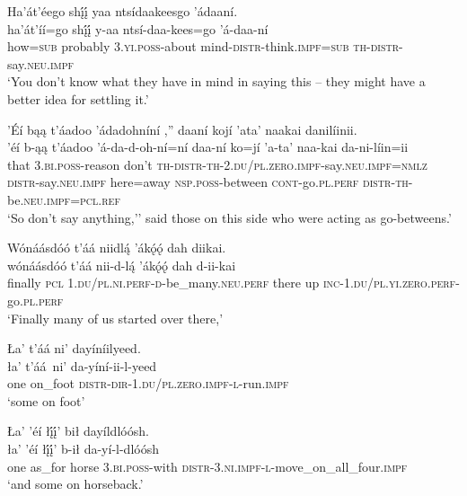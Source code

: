 \newpage
\ea\label{ex:text1-57-4}
Ha’át’éego shį́į́ yaa ntsídaakeesgo ’ádaaní.\\
\gll ha’át’íí=go	shį́į́	y-aa	ntsí-daa-kees=go	’á-daa-ní\\
     how=\textsc{sub}	probably	3.\textsc{yi}.\textsc{poss}-about	mind-\textsc{distr}-think.\textsc{impf}=\textsc{sub}	\textsc{th}-\textsc{distr}-say.\textsc{neu}.\textsc{impf}\\
\glt `You don't know what they have in mind in saying this -- they might have a better idea for settling it.'
\z

\ea\label{ex:text1-57-5}
’Éí bąą t’áadoo ’ádadohníní ,'' daaní kojí ’ata’ naakai danilíinii.\\
\gll ’éí	b-ąą	t’áadoo	’á-da-d-oh-ní=ní	daa-ní	ko=jí	’a-ta’	naa-kai	da-ni-líin=ii\\
     that	3.\textsc{bi}.\textsc{poss}-reason	don’t	\textsc{th}-\textsc{distr}-\textsc{th}-2.\textsc{du}/\textsc{pl}.\textsc{zero}.\textsc{impf}-say.\textsc{neu}.\textsc{impf}=\textsc{nmlz}	\textsc{distr}-say.\textsc{neu}.\textsc{impf}	here=away	\textsc{nsp}.\textsc{poss}-between	\textsc{cont}-go.\textsc{pl}.\textsc{perf}	\textsc{distr}-\textsc{th}-be.\textsc{neu}.\textsc{impf}=\textsc{pcl}.\textsc{ref}\\
\glt `So don't say anything,'' said those on this side who were acting as go-betweens.'
\z

\ea\label{ex:text1-58-1}
Wónáásdóó t’áá niidlą́ ’ákǫ́ǫ́ dah diikai.\\
\gll wónáásdóó	t’áá	nii-d-lą́	’ákǫ́ǫ́	dah	d-ii-kai\\
     finally	\textsc{pcl}	1.\textsc{du}/\textsc{pl}.\textsc{ni}.\textsc{perf}-\textsc{d}-be\_many.\textsc{neu}.\textsc{perf}	there	up	\textsc{inc}-1.\textsc{du}/\textsc{pl}.\textsc{yi}.\textsc{zero}.\textsc{perf}-go.\textsc{pl}.\textsc{perf}\\
\glt `Finally many of us started over there,'
\z

\ea\label{ex:text1-58-2}
Ła’ t’áá ni’ dayíníilyeed.\\
\gll ła’	t’áá~{ni’}	da-yíní-ii-l-yeed\\
     one	on\_foot	\textsc{distr}-\textsc{dir}-1.\textsc{du}/\textsc{pl}.\textsc{zero}.\textsc{impf}-\textsc{l}-run.\textsc{impf}\\
\glt `some on foot'
\z

\ea\label{ex:text1-58-3}
Ła’ ’éí łį́į́’ bił dayíldlóósh.\\
\gll ła’	’éí	łį́į́’	b-ił	da-yí-l-dlóósh\\
     one	as\_for	horse	3.\textsc{bi}.\textsc{poss}-with	\textsc{distr}-3.\textsc{ni}.\textsc{impf}-\textsc{l}-move\_on\_all\_four.\textsc{impf}\\
\glt `and some on horseback.'
\z


